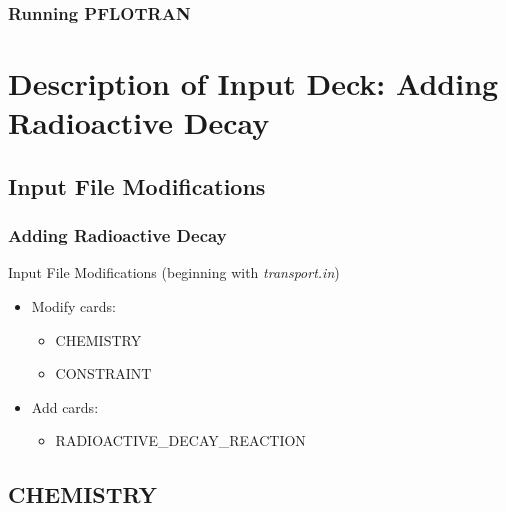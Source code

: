 \documentclass{beamer}
\begin{document}
\begin{frame}[fragile]\frametitle{Running PFLOTRAN}


\end{frame}

\section{Description of Input Deck: Adding Radioactive Decay}

\subsection{Input File Modifications}

\begin{frame}[fragile]\frametitle{Adding Radioactive Decay}

Input File Modifications (beginning with \textit{transport.in})
\begin{itemize}
\item Modify cards:
  \begin{itemize}
    \item CHEMISTRY
    \item CONSTRAINT
   \end{itemize}
\item Add cards:
  \begin{itemize}
    \item RADIOACTIVE\_DECAY\_REACTION
  \end{itemize}
\end{itemize}

\end{frame}

\subsection{CHEMISTRY}
\end{document}
